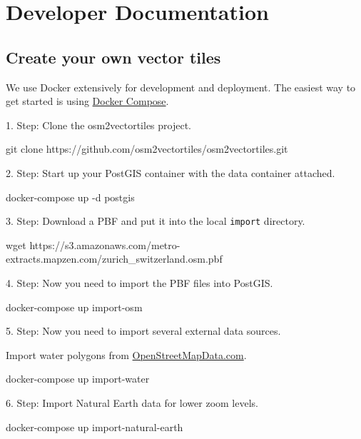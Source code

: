 \chapter{Developer Documentation}

\section{Create your own vector tiles}\label{create-your-own-vector-tiles}

We use Docker extensively for development and deployment. The easiest
way to get started is using
\href{https://www.docker.com/docker-compose}{Docker Compose}.

1. Step: Clone the osm2vectortiles project.

\begin{bashcode}
git clone https://github.com/osm2vectortiles/osm2vectortiles.git
\end{bashcode}

2. Step: Start up your PostGIS container with the data container attached.

\begin{bashcode}
docker-compose up -d postgis
\end{bashcode}

3. Step: Download a PBF and put it into the local \texttt{import} directory.

\begin{bashcode}
wget https://s3.amazonaws.com/metro-extracts.mapzen.com/zurich_switzerland.osm.pbf
\end{bashcode}

4. Step: Now you need to import the PBF files into PostGIS.

\begin{bashcode}
docker-compose up import-osm
\end{bashcode}

5. Step: Now you need to import several external data sources.

Import water polygons from
\href{http://openstreetmapdata.com/data/water-polygons}{OpenStreetMapData.com}.

\begin{bashcode}
docker-compose up import-water
\end{bashcode}

6. Step: Import Natural Earth data for lower zoom levels.

\begin{bashcode}
docker-compose up import-natural-earth
\end{bashcode}

